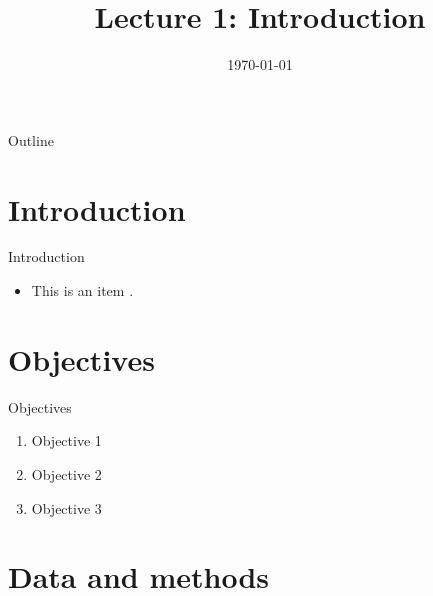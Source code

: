 \documentclass[11pt]{beamer}
\title[\thecoursename]{Lecture 1: Introduction}
\author[\theinstructor]{\theinstructor}
\institute[NUS]{\footnotesize \theinstitution}
\date[\thesemester]{\footnotesize \today}
\begin{document}
\begin{frame}
    \titlepage
\end{frame}

\begin{frame}{Outline}
    \tableofcontents[hideallsubsections]
\end{frame}

\section{Introduction}

\begin{frame}{Introduction}
    \begin{itemize}
        \item This is an item \parencite{wang_enduring_2025}.
    \end{itemize}
\end{frame}

\section{Objectives}

\begin{frame}{Objectives}
    \begin{enumerate}
        \item Objective 1
        \item Objective 2
        \item Objective 3
    \end{enumerate}
\end{frame}

\section{Data and methods}
\end{document}
